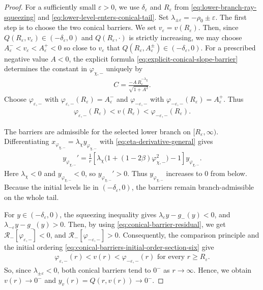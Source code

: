 \documentclass{amsart}
\theoremstyle{plain}
\theoremstyle{mainintrothm}
\theoremstyle{definition}
\begin{document}
\begin{proof}
	For a sufficiently small $\varepsilon>0$, we use
	$\delta_\varepsilon$ and $R_\varepsilon$ from
	\eqref{eq:lower-branch-ray-squeezing} and
	\eqref{eq:lower-level-enters-conical-tail}.  Set
	$\lambda_{\pm\varepsilon}=-\rho_0\pm\varepsilon$. The first step is to choose the two conical barriers.  We set
	$v_\varepsilon=v(R_\varepsilon)$.  Then, since 
	$Q(R_\varepsilon,v_\varepsilon)\in(-\delta_\varepsilon,0)$ and
	$Q(R_\varepsilon,\cdot)$ is strictly increasing, we may choose
	$A_\varepsilon^-<v_\varepsilon<A_\varepsilon^+<0$ so close to
	$v_\varepsilon$ that
	$Q(R_\varepsilon,A_\varepsilon^\pm)\in(-\delta_\varepsilon,0)$.  For a
	prescribed negative value $A<0$, the explicit formula
	\eqref{eq:explicit-conical-slope-barrier} determines the constant in
	$\varphi_{\chi,-}$ uniquely by
	\begin{align}
		\label{eq:conical-constant-choice-section-six}
		C
		=
		\frac{-A\,R_\varepsilon^{-\lambda_\chi}}
		{\sqrt{1+A^2}}.
	\end{align}
	Choose $\varphi_{\varepsilon,-}$ with
	$\varphi_{\varepsilon,-}(R_\varepsilon)=A_\varepsilon^-$ and
	$\varphi_{-\varepsilon,-}$ with
	$\varphi_{-\varepsilon,-}(R_\varepsilon)=A_\varepsilon^+$.  Thus
	\begin{align}
		\label{eq:conical-barriers-initial-order-section-six}
		\varphi_{\varepsilon,-}(R_\varepsilon)
		<
		v(R_\varepsilon)
		<
		\varphi_{-\varepsilon,-}(R_\varepsilon).
	\end{align}
	
	\medskip
	
	The barriers are admissible for the selected lower branch on
	$[R_\varepsilon,\infty)$.  Differentiating
	$x_{\varphi_{\chi,-}}=\lambda_\chi y_{\varphi_{\chi,-}}$ with
	\eqref{eq:eta-derivative-general} gives
	\begin{align*}
		y_{\varphi_{\chi,-}}'
		=
		\frac{1}{r}
		\left[
		\lambda_\chi
		\bigl(1+(1-2\beta)\varphi_{\chi,-}^2\bigr)
		-
		1
		\right]
		y_{\varphi_{\chi,-}}.
	\end{align*}
	Here $\lambda_\chi<0$ and $y_{\varphi_{\chi,-}}<0$, so
	$y_{\varphi_{\chi,-}}'>0$.  Thus
	$y_{\varphi_{\chi,-}}$ increases to $0$ from below.  Because the initial
	levels lie in $(-\delta_\varepsilon,0)$, the barriers remain branch-admissible
	on the whole tail.
	
	\medskip
	
	For $y\in(-\delta_\varepsilon,0)$, the squeezing inequality gives $\lambda_{\varepsilon}y-g_-(y)<0$, and $\lambda_{-\varepsilon}y-g_-(y)>0$. Then, by using \eqref{eq:conical-barrier-residual}, we get $\mathcal R_-[\varphi_{\varepsilon,-}]<0$, and $\mathcal R_-[\varphi_{-\varepsilon,-}]>0$.
	Consequently, the comparison principle and the initial ordering
	\eqref{eq:conical-barriers-initial-order-section-six} give
	\begin{align*}
		\varphi_{\varepsilon,-}(r)<v(r)<\varphi_{-\varepsilon,-}(r)
		\mbox{ for every }r\ge R_\varepsilon.
	\end{align*}
	So, since $\lambda_{\pm\varepsilon}<0$, both conical barriers tend to $0^-$ as
	$r\to\infty$.  Hence, we obtain $v(r)\to0^-$ and $y_v(r)=Q(r,v(r))\to0^-$.
	

\end{proof}
\end{document}

